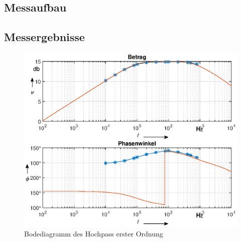 \subsection{Messaufbau}

\subsection{Messergebnisse}
\begin{figure}[H]
    \centering
    \includegraphics[width=\costumPicWidth]{Lab_2/Plots/HP_first_order.eps}
    \caption{Bodediagramm des Hochpass erster Ordnung}
    \label{fig:Bode_HP_first_order}
\end{figure}
